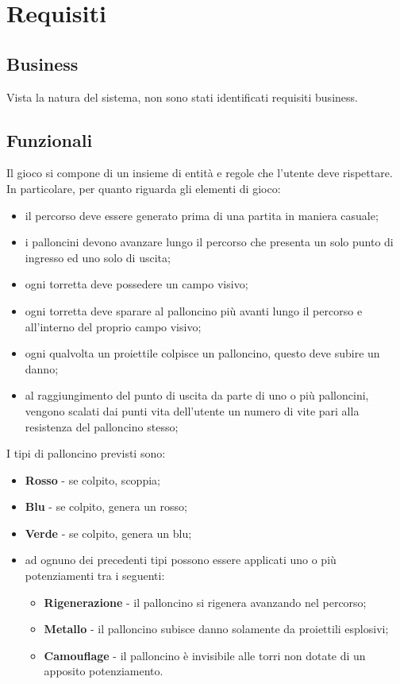 \section{Requisiti}
\subsection{Business}
Vista la natura del sistema, non sono stati identificati requisiti business.

\subsection{Funzionali}
Il gioco si compone di un insieme di entità e regole che l'utente deve rispettare. In particolare, per quanto riguarda gli elementi di gioco:
\begin{itemize}
    \item il percorso deve essere generato prima di una partita in maniera casuale;
    \item i palloncini devono avanzare lungo il percorso che presenta un solo punto di ingresso ed uno solo di uscita;
    \item ogni torretta deve possedere un campo visivo;
    \item ogni torretta deve sparare al palloncino più avanti lungo il percorso e all'interno del proprio campo visivo;
    \item ogni qualvolta un proiettile colpisce un palloncino, questo deve subire un danno;
    \item al raggiungimento del punto di uscita da parte di uno o più palloncini, vengono scalati dai punti vita dell'utente un numero di vite pari alla resistenza del palloncino stesso;
\end{itemize}

I tipi di palloncino previsti sono:
\begin{itemize}
    \item \textbf{Rosso} - se colpito, scoppia;
    \item \textbf{Blu} - se colpito, genera un rosso;
    \item \textbf{Verde} - se colpito, genera un blu;
    \item ad ognuno dei precedenti tipi possono essere applicati uno o più potenziamenti tra i seguenti:
    \begin{itemize}
        \item \textbf{Rigenerazione} - il palloncino si rigenera avanzando nel percorso;
        \item \textbf{Metallo} - il palloncino subisce danno solamente da proiettili esplosivi;
        \item \textbf{Camouflage} - il palloncino è invisibile alle torri non dotate di un apposito potenziamento.
    \end{itemize}
\end{itemize}

